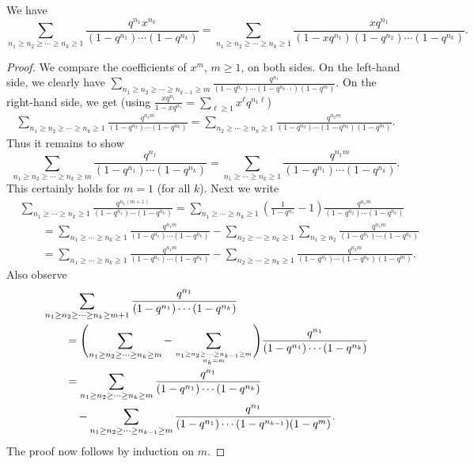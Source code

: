 \documentclass[10pt,a4paper]{amsart}
\begin{document}
\begin{Lemma} \label{qz} We have
\[
\sum_{n_1 \geq n_2 \geq \cdots \geq n_k \geq 1} \frac{q^{n_1} x^{n_k}}{(1-q^{n_1}) \cdots (1-q^{n_k})}=\sum_{n_1 \geq n_2 \geq \cdots \geq n_k \geq 1} \frac{x q^{n_1}}{(1-x q^{n_1})(1-q^{n_2}) \cdots (1-q^{n_k})}.
\]
\end{Lemma}

\begin{proof} We compare the coefficients of $x^{m}$, $m \geq 1$, on both sides. On the left-hand side, we clearly have
$\sum_{n_1 \geq n_2 \geq \cdots \geq n_{k-1} \geq m} \frac{q^{n_1}}{(1-q^{n_1}) \cdots (1-q^{n_{k-1}})(1-q^{m})}$. On the right-hand side, we
get (using $\frac{xq^{n_1}}{1-x q^{n_1}}=\sum_{\ell \geq 1} x^\ell q^{n_1 \ell}$)
\begin{align*}
 \sum_{n_1 \geq n_2 \geq \cdots \geq n_k \geq 1} \frac{q^{n_1 m}}{(1-q^{n_2}) \cdots (1-q^{n_k})}
 =\sum_{ n_2 \geq \cdots \geq n_k \geq 1} \frac{q^{n_2 m}}{(1-q^{n_2}) \cdots (1-q^{n_k})(1-q^m)}.
\end{align*}
Thus it remains to show
\[
\sum_{n_1 \geq n_2 \geq \cdots \geq n_{k} \geq m} \frac{q^{n_1}}{(1-q^{n_1}) \cdots (1-q^{n_{k}})}=\sum_{ n_1 \geq \cdots \geq n_k \geq 1} \frac{q^{n_1 m}}{(1-q^{n_1}) \cdots (1-q^{n_k})}.
\]
This certainly holds for $m=1$ (for all $k$). Next we write
\begin{align*}
& \sum_{ n_1 \geq \cdots \geq n_k \geq 1} \frac{q^{n_1 (m+1)}}{(1-q^{n_1}) \cdots (1-q^{n_k})}=\sum_{ n_1 \geq \cdots \geq n_k \geq 1} \left(\frac{1}{1-q^{n_1}}-1 \right) \frac{q^{n_1 m}}{(1-q^{n_2}) \cdots (1-q^{n_k})} \\
& \qquad = \sum_{ n_1 \geq \cdots \geq n_k \geq 1} \frac{q^{n_1 m}}{(1-q^{n_1}) \cdots (1-q^{n_k})} - \sum_{ n_2 \geq \cdots \geq n_{k} \geq 1} \sum_{n_1 \geq n_2}
\frac{q^{n_1 m}}{(1-q^{n_1}) \cdots (1-q^{n_k})} \\
& \qquad = \sum_{ n_1 \geq \cdots \geq n_k \geq 1} \frac{q^{n_1 m}}{(1-q^{n_1}) \cdots (1-q^{n_k})} - \sum_{ n_2 \geq \cdots \geq n_{k} \geq 1}
\frac{q^{n_2 m}}{(1-q^{n_2}) \cdots (1-q^{n_k})(1-q^m)}.
\end{align*}
Also observe
\begin{align*}
& \sum_{n_1 \geq n_2 \geq \cdots \geq n_{k} \geq m+1} \frac{q^{n_1}}{(1-q^{n_1}) \cdots (1-q^{n_{k}})} \\
& \qquad =\Biggl( \sum_{n_1 \geq n_2 \geq \cdots \geq n_{k} \geq m} - \sum_{n_1 \geq n_2 \geq \cdots \geq n_{k-1} \geq m \atop n_{k}= m} \Biggr) \frac{q^{n_1}}{(1-q^{n_1}) \cdots (1-q^{n_{k}})} \\
&\qquad =\sum_{n_1 \geq n_2 \geq \cdots \geq n_{k} \geq m} \frac{q^{n_1}}{(1-q^{n_1}) \cdots (1-q^{n_{k}})} \\
& \qquad\quad-\sum_{n_1 \geq n_2 \geq \cdots \geq n_{k-1} \geq m} \frac{q^{n_1}}{(1-q^{n_1}) \cdots (1-q^{n_{k-1}})(1-q^m)}.
\end{align*}
The proof now follows by induction on $m$.
\end{proof}
\end{document}
